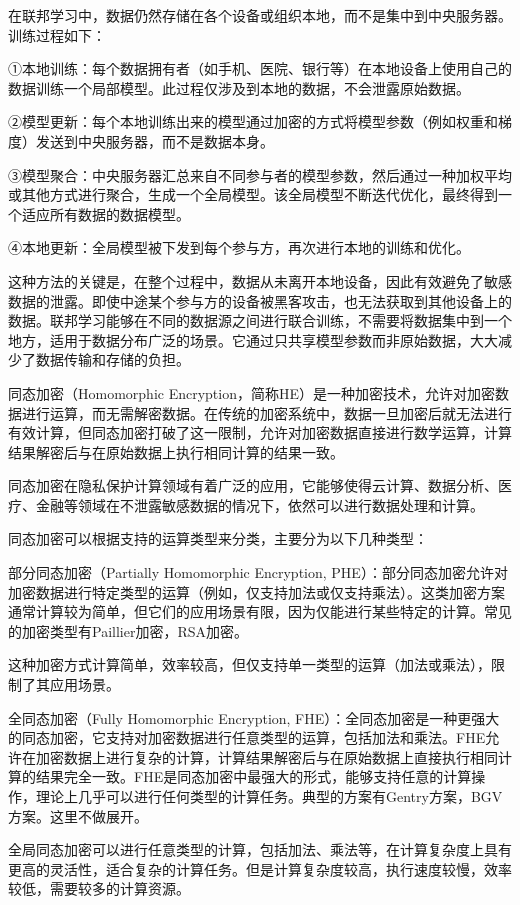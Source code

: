 在联邦学习中，数据仍然存储在各个设备或组织本地，而不是集中到中央服务器。训练过程如下：

①本地训练：每个数据拥有者（如手机、医院、银行等）在本地设备上使用自己的数据训练一个局部模型。此过程仅涉及到本地的数据，不会泄露原始数据。

②模型更新：每个本地训练出来的模型通过加密的方式将模型参数（例如权重和梯度）发送到中央服务器，而不是数据本身。

③模型聚合：中央服务器汇总来自不同参与者的模型参数，然后通过一种加权平均或其他方式进行聚合，生成一个全局模型。该全局模型不断迭代优化，最终得到一个适应所有数据的数据模型。

④本地更新：全局模型被下发到每个参与方，再次进行本地的训练和优化。

这种方法的关键是，在整个过程中，数据从未离开本地设备，因此有效避免了敏感数据的泄露。即使中途某个参与方的设备被黑客攻击，也无法获取到其他设备上的数据。联邦学习能够在不同的数据源之间进行联合训练，不需要将数据集中到一个地方，适用于数据分布广泛的场景。它通过只共享模型参数而非原始数据，大大减少了数据传输和存储的负担。


同态加密（Homomorphic Encryption，简称HE）是一种加密技术，允许对加密数据进行运算，而无需解密数据。在传统的加密系统中，数据一旦加密后就无法进行有效计算，但同态加密打破了这一限制，允许对加密数据直接进行数学运算，计算结果解密后与在原始数据上执行相同计算的结果一致。

同态加密在隐私保护计算领域有着广泛的应用，它能够使得云计算、数据分析、医疗、金融等领域在不泄露敏感数据的情况下，依然可以进行数据处理和计算。

同态加密可以根据支持的运算类型来分类，主要分为以下几种类型：

部分同态加密（Partially Homomorphic Encryption, PHE）：部分同态加密允许对加密数据进行特定类型的运算（例如，仅支持加法或仅支持乘法）。这类加密方案通常计算较为简单，但它们的应用场景有限，因为仅能进行某些特定的计算。常见的加密类型有Paillier加密，RSA加密。

这种加密方式计算简单，效率较高，但仅支持单一类型的运算（加法或乘法），限制了其应用场景。

全同态加密（Fully Homomorphic Encryption, FHE）：全同态加密是一种更强大的同态加密，它支持对加密数据进行任意类型的运算，包括加法和乘法。FHE允许在加密数据上进行复杂的计算，计算结果解密后与在原始数据上直接执行相同计算的结果完全一致。FHE是同态加密中最强大的形式，能够支持任意的计算操作，理论上几乎可以进行任何类型的计算任务。典型的方案有Gentry方案，BGV方案。这里不做展开。

全局同态加密可以进行任意类型的计算，包括加法、乘法等，在计算复杂度上具有更高的灵活性，适合复杂的计算任务。但是计算复杂度较高，执行速度较慢，效率较低，需要较多的计算资源。


